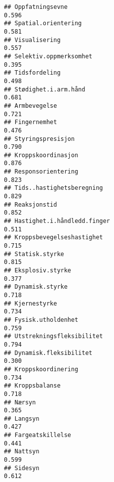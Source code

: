 \documentclass[
]{article}
\begin{document}
\begin{verbatim}
## Oppfatningsevne                                                                  0.596
## Spatial.orientering                                                              0.581
## Visualisering                                                                    0.557
## Selektiv.oppmerksomhet                                                           0.395
## Tidsfordeling                                                                    0.498
## Stødighet.i.arm.hånd                                                             0.681
## Armbevegelse                                                                     0.721
## Fingernemhet                                                                     0.476
## Styringspresisjon                                                                0.790
## Kroppskoordinasjon                                                               0.876
## Responsorientering                                                               0.823
## Tids..hastighetsberegning                                                        0.829
## Reaksjonstid                                                                     0.852
## Hastighet.i.håndledd.finger                                                      0.511
## Kroppsbevegelseshastighet                                                        0.715
## Statisk.styrke                                                                   0.815
## Eksplosiv.styrke                                                                 0.377
## Dynamisk.styrke                                                                  0.718
## Kjernestyrke                                                                     0.734
## Fysisk.utholdenhet                                                               0.759
## Utstrekningsfleksibilitet                                                        0.794
## Dynamisk.fleksibilitet                                                           0.300
## Kroppskoordinering                                                               0.734
## Kroppsbalanse                                                                    0.718
## Nærsyn                                                                           0.365
## Langsyn                                                                          0.427
## Fargeatskillelse                                                                 0.441
## Nattsyn                                                                          0.599
## Sidesyn                                                                          0.612

\end{verbatim}
\end{document}
